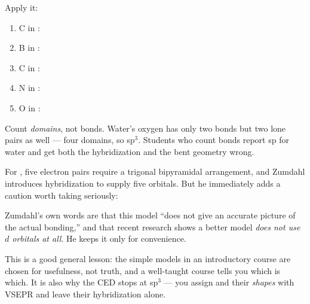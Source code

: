 \documentclass{apchem-notes}
\begin{document}
Apply it:
\begin{enumerate}[leftmargin=*,itemsep=0.3em]
  \item C in : 
  \item B in : 
  \item C in : 
  \item N in : 
  \item O in : 
\end{enumerate}

\begin{apctrap}
Count \emph{domains}, not bonds. Water's oxygen has only two bonds but two
lone pairs as well --- four domains, so sp$^3$. Students who count bonds
report sp for water and get both the hybridization and the bent geometry
wrong.
\end{apctrap}



For , five electron pairs require a trigonal bipyramidal
arrangement, and Zumdahl introduces  hybridization to supply
five orbitals. But he immediately adds a caution worth taking seriously:

\begin{apcnote}
Zumdahl's own words are that this model ``does not give an accurate picture
of the actual bonding,'' and that recent research shows a better model
\emph{does not use $d$ orbitals at all}. He keeps it only for convenience.

This is a good general lesson: the simple models in an introductory course
are chosen for usefulness, not truth, and a well-taught course tells you
which is which. It is also why the CED stops at sp$^3$ --- you assign
 and  their \emph{shapes} with VSEPR and leave their
hybridization alone.
\end{apcnote}

\end{document}

